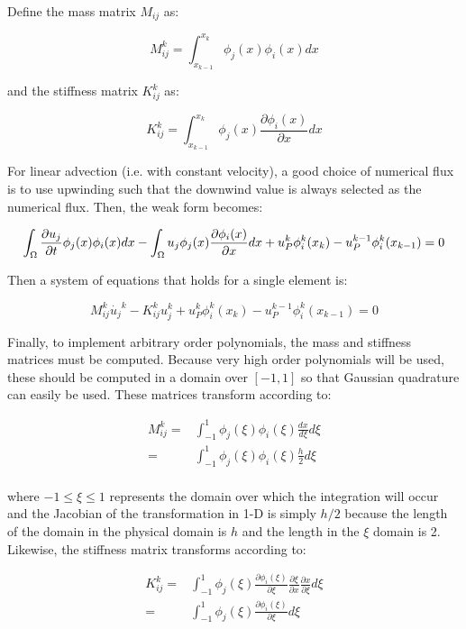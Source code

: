 \documentclass[10pt]{article}
\newcommand{\beq}{\begin{equation}}
\newcommand{\eeq}{\end{equation}}
\newcommand{\beqa}{\begin{equation}\begin{aligned}}
\newcommand{\eeqa}{\end{aligned}\end{equation}}
\begin{document}
Define the mass matrix \(M_{ij}\) as:

\beq
M_{ij}^k=\int_{x_{k-1}}^{x_k}\phi_j(x)\phi_i(x)dx
\eeq

and the stiffness matrix \(K_{ij}^k\) as:

\beq
K_{ij}^k=\int_{x_{k-1}}^{x_k}\phi_j(x)\frac{\partial \phi_i(x)}{\partial x}dx
\eeq

For linear advection (i.e. with constant velocity), a good choice of numerical flux is to use upwinding such that the downwind value is always selected as the numerical flux. Then, the weak form becomes:

\beq
\int_{\Omega}\frac{\partial u_j}{\partial t}\phi_j(x)\phi_i(x)dx-\int_{\Omega}u_j\phi_j(x)\frac{\partial \phi_i(x)}{\partial x}dx+u_P^k\phi_i^k(x_{k})-u_P^{k-1}\phi_i^k(x_{k-1})=0\\
\eeq

Then a system of equations that holds for a single element is:

\beq
M_{ij}^k\dot{u_j}^k-K_{ij}^ku_j^k+u_P^k\phi_i^k(x_{k})-u_P^{k-1}\phi_i^k(x_{k-1})=0
\eeq



Finally, to implement arbitrary order polynomials, the mass and stiffness matrices must be computed. Because very high order polynomials will be used, these should be computed in a domain over \([-1,1]\) so that Gaussian quadrature can easily be used. These matrices transform according to:

\beqa
M_{ij}^k=&\int_{-1}^{1}\phi_j(\xi)\phi_i(\xi)\frac{dx}{d\xi}d\xi\\
=&\int_{-1}^{1}\phi_j(\xi)\phi_i(\xi)\frac{h}{2}d\xi\\
\eeqa

where \(-1\leq\xi\leq1\) represents the domain over which the integration will occur and the Jacobian of the transformation in 1-D is simply \(h/2\) because the length of the domain in the physical domain is \(h\) and the length in the \(\xi\) domain is 2. Likewise, the stiffness matrix transforms according to:

\beqa
K_{ij}^k=&\int_{-1}^{1}\phi_j(\xi)\frac{\partial \phi_i(\xi)}{\partial \xi}\frac{\partial \xi}{\partial x}\frac{\partial x}{\partial \xi}d\xi\\
=&\int_{-1}^{1}\phi_j(\xi)\frac{\partial \phi_i(\xi)}{\partial \xi}d\xi\\
\eeqa
\end{document}
